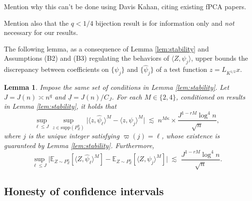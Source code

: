 \documentclass[11pt,a4paper]{article}
\renewcommand{\hat}{\widehat}
\theoremstyle{definition}
\theoremstyle{plain}
\newtheorem{lemma}{Lemma}[section]
\theoremstyle{remark}
\newcommand{\supp}{\mathrm{supp}}
\newcommand{\und}{\underline}
\begin{document}


{\color{red} Mention why this can't be done using Davis Kahan, citing existing fPCA papers.}

{\color{red} Mention also that the $q<1/4$ bijection result is for information only and \emph{not} necessary for our results.}


The following lemma, as a consequence of Lemma \ref{lem:stability} and Assumptions (B2) and (B3) regulating the behaviors of $\langle Z,\psi_j\rangle$,
upper bounds the discrepancy between coefficients on $\{\psi_j\}$ and $\{\hat\psi_j\}$ of a test function $z=L_{K^{1/2}}x$.
\begin{lemma}
Impose the same set of conditions in Lemma \ref{lem:stability}.
Let $J=J(n)\asymp n^q$ and $\und J=J(n)/C_J$.
For each $M\in\{2,4\}$, conditioned on results in Lemma \ref{lem:stability},
it holds that
$$
\sup_{\ell\leq J}\sup_{z\in\supp(P_Z^n)}\big|\langle z,\hat\psi_\ell\rangle^M - \langle z,\psi_j\rangle^M\big|\; \lesssim\; n^{M\kappa}\times \frac{J^{1-rM}\log^4 n}{\sqrt{n}},
$$
where $j$ is the unique integer satisfying $\varpi(j)=\ell$, whose existence is guaranteed by Lemma \ref{lem:stability}.
Furthermore, 
$$
\sup_{\ell\leq J}\bigg|\mathbb E_{Z\sim P_Z^n}\left[\langle Z,\hat\psi_\ell\rangle^M\right] -\mathbb E_{Z\sim P_Z^n}\left[\langle Z,\psi_j\rangle^M\right]\bigg|
\;\lesssim\;\frac{J^{1-rM}\log^4 n}{\sqrt{n}}.
$$
\label{lem:zpsi-stability}
\end{lemma}

\subsection{Honesty of confidence intervals}
\end{document}
